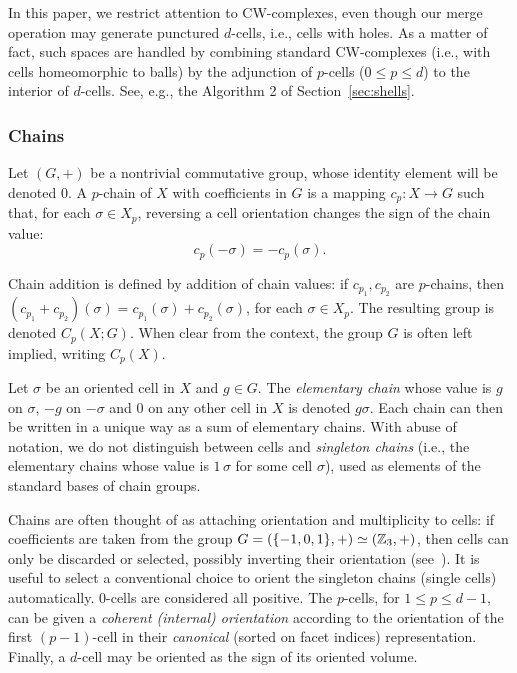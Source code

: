 {In this paper, we restrict attention to CW-complexes, even though our merge operation may generate punctured $d$-cells, i.e., cells with holes. As a matter of fact, such spaces are handled by combining standard CW-complexes (i.e., with cells homeomorphic to balls) by the adjunction of $p$-cells ($0\leq p\leq d$) to the interior of $d$-cells. See, e.g., the Algorithm 2 of Section~\ref{sec:shells}.}

\subsubsection{{Chains}}
\label{sec:thechains}

Let $(G,+)$ be a nontrivial commutative group, {whose identity element will be denoted $0$}. A $p$-chain of $X$ with coefficients in $G$ is a mapping $c_p : X \to G$ such that, for each $\sigma \in X_p$, reversing a cell orientation changes the sign of the chain value:
$$
c_p(-\sigma) = -c_p(\sigma).
$$

Chain addition is defined by addition of chain values: if $c_{p_1}, c_{p_2}$ are $p$-chains, then $(c_{p_1} + c_{p_2})(\sigma) = c_{p_1}(\sigma) + c_{p_2}(\sigma)$, for each $\sigma \in X_p$. The resulting group is denoted $C_p(X;G)$. When clear from the context, the group $G$ is often left implied, writing $C_p(X)$.

Let $\sigma$ be an oriented cell in $X$ and $g \in G$. The \emph{elementary chain} whose value is $g$ on $\sigma$, $-g$ on $-\sigma$ and 0 on any other cell in $X$ is denoted $g\sigma$. Each chain can then be written in a unique way as a sum of elementary chains.
With abuse of notation, we do not distinguish between cells and \emph{singleton chains} (i.e., the elementary chains whose value is $1\,\sigma$ for some cell $\sigma$), used as elements of the standard bases of chain groups.

         Chains are often thought of as attaching orientation and multiplicity to cells: if coefficients are taken from the group {$G = (\{-1,0,1\}, +) \simeq (\mathbb{Z}_3,+)$}, then cells can only be discarded or selected, possibly inverting their orientation (see~\cite{ieee-tase}).
It is useful to select a conventional choice to orient the singleton chains (single cells) automatically. 0-cells are considered all positive. The $p$-cells, for $1\leq p\leq d-1$, can be given a \emph{coherent (internal) orientation} according to the orientation of the first $(p-1)$-cell in their \emph{canonical} (sorted on facet indices) representation. Finally, a $d$-cell may be oriented as the sign of its oriented volume.

